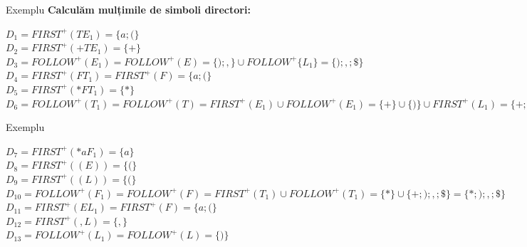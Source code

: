\documentclass[pdf]{beamer}
\begin{document}
\begin{frame}{Exemplu}
\textbf{Calculăm mulțimile de simboli directori:}

$D_1=FIRST^+(TE_1)=\{a;(\}$\\

$D_2=FIRST^+(+TE_1)=\{+\}$\\

$D_3=FOLLOW^+(E_1)=FOLLOW^+(E)=\{);,\}\cup FOLLOW^+\{L_1\}=\{);,;\$\}$\\

$D_4=FIRST^+(FT_1)=FIRST^+(F)=\{a;(\}$\\

$D_5=FIRST^+(*FT_1)=\{*\}$\\

$D_6=FOLLOW^+(T_1)=FOLLOW^+(T)=FIRST^+(E_1)\cup FOLLOW^+(E_1)=\{+\}\cup \{)\}\cup FIRST^+(L_1)=\{+;);,;\$\}$\\
\end{frame}



\begin{frame}{Exemplu}

$D_7=FIRST^+(*aF_1)=\{a\}$\\
$D_8=FIRST^+((E))=\{(\}$\\
$D_9=FIRST^+((L))=\{(\}$\\
$D_10=FOLLOW^+(F_1)=FOLLOW^+(F)=FIRST^+(T_1)\cup FOLLOW^+(T_1)=\{*\}\cup \{+;);,;\$\}=\{*;);,;\$\}$\\
$D_11=FIRST^+(EL_1)=FIRST^+(F)=\{a;(\}$\\
$D_12=FIRST^+(,L)=\{,\}$\\
$D_13=FOLLOW^+(L_1)=FOLLOW^+(L)=\{)\}$
\end{frame}
\end{document}
